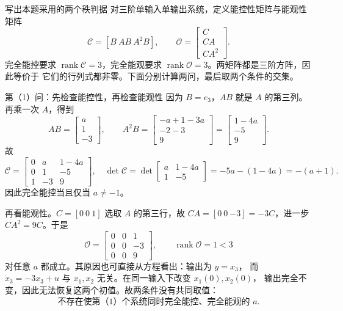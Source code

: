 \documentclass[11pt]{article}
\begin{document}
\begin{solution}
\begin{proofstep}{写出本题采用的两个秩判据}
对三阶单输入单输出系统，定义能控性矩阵与能观性矩阵
\[
\mathcal C=[B\ AB\ A^2B],\qquad
\mathcal O=\begin{bmatrix}C\\CA\\CA^2\end{bmatrix}.
\]
完全能控要求 $\operatorname{rank}\mathcal C=3$，完全能观要求
$\operatorname{rank}\mathcal O=3$。两矩阵都是三阶方阵，因此等价于
它们的行列式都非零。下面分别计算两问，最后取两个条件的交集。
\end{proofstep}

\begin{proofstep}{第（1）问：先检查能控性，再检查能观性}
因为 $B=e_3$，$AB$ 就是 $A$ 的第三列。再乘一次 $A$，得到
\[
AB=\begin{bmatrix}a\\1\\-3\end{bmatrix},\qquad
A^2B=\begin{bmatrix}-a+1-3a\\-2-3\\9\end{bmatrix}
=\begin{bmatrix}1-4a\\-5\\9\end{bmatrix}.
\]
故
\[
\mathcal C=\begin{bmatrix}0&a&1-4a\\0&1&-5\\1&-3&9\end{bmatrix},
\quad
\det\mathcal C=
\det\begin{bmatrix}a&1-4a\\1&-5\end{bmatrix}
=-5a-(1-4a)=-(a+1).
\]
因此完全能控当且仅当 $a\ne-1$。

再看能观性。$C=[0\ 0\ 1]$ 选取 $A$ 的第三行，故
$CA=[0\ 0\ {-3}]=-3C$，进一步 $CA^2=9C$。于是
\[
\mathcal O=\begin{bmatrix}0&0&1\\0&0&-3\\0&0&9\end{bmatrix},\qquad
\operatorname{rank}\mathcal O=1<3
\]
对任意 $a$ 都成立。其原因也可直接从方程看出：输出为 $y=x_3$，
而 $\dot x_3=-3x_3+u$ 与 $x_1,x_2$ 无关。在同一输入下改变 $x_1(0),x_2(0)$，
输出完全不变，因此无法恢复这两个初值。故两条件没有共同取值：
\[
\boxed{\text{不存在使第（1）个系统同时完全能控、完全能观的 }a.}
\]
\end{proofstep}


\end{solution}
\end{document}
